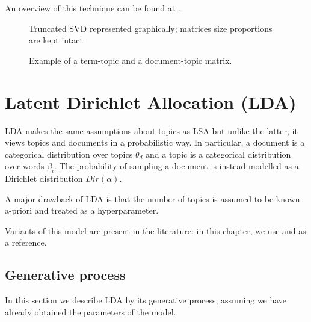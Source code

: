 An overview of this technique can be found at \cite{doi:10.1002/aris.1440380105}.

\begin{figure}[h]
    \centering
    \caption{Truncated SVD represented graphically; matrices size proportions are kept intact}
    \label{fig:svd}
\end{figure}

\begin{figure}[h]
    \centering
    \caption{Example of a term-topic and a document-topic matrix.}
    \label{fig:topicmat}
\end{figure}

\section{Latent Dirichlet Allocation (LDA)}
LDA makes the same assumptions about topics as LSA but unlike the latter, it views topics and documents in a probabilistic way.
In particular, a document is a categorical distribution over topics $\theta_d$ and a topic is a categorical distribution over words $\beta_i$.
The probability of sampling a document is instead modelled as a Dirichlet distribution $Dir(\alpha)$.

A major drawback of LDA is that the number of topics is assumed to be known a-priori and treated as a hyperparameter.

Variants of this model are present in the literature: in this chapter, we use \cite{10.1145/2107736.2107741} and \cite{DBLP:journals/jmlr/BleiNJ03} as a reference.

\subsection{Generative process} \label{gp}
In this section we describe LDA by its generative process, assuming we have already obtained the parameters of the model.

